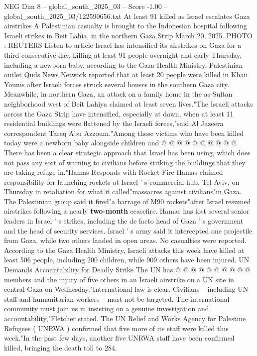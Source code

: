 \begin{textsample}{NEG Dim 8 – global\_south\_2025\_03 – Score -1.00 – global\_south\_2025\_03/122590656.txt}  \label{ex:f8_neg_079}
At least 91 killed as Israel escalates Gaza airstrikes A Palestinian casualty is brought to the Indonesian hospital following Israeli strikes in Beit Lahia, in the northern Gaza Strip March 20, 2025.
PHOTO : REUTERS Listen to article Israel has intensified its airstrikes on Gaza for a third consecutive day, killing at least 91 people overnight and early Thursday, including a newborn baby, according to the Gaza Health Ministry.
Palestinian outlet Quds News Network reported that at least 20 people were killed in Khan Younis after Israeli forces struck several houses in the southern Gaza city.
Meanwhile, in northern Gaza, an attack on a family home in the as-Sultan neighborhood west of Beit Lahiya claimed at least seven lives."The Israeli attacks across the Gaza Strip have intensified, especially at dawn, when at least 11 residential buildings were flattened by the Israeli forces,"said Al Jazeera correspondent Tareq Abu Azzoum."Among those victims who have been killed today were a newborn baby alongside children and @ @ @ @ @ @ @ @ @ @ There has been a clear strategic approach that Israel has been using, which does not pass any sort of warning to civilians before striking the buildings that they are taking refuge in."Hamas Responds with Rocket Fire Hamas claimed responsibility for launching rockets at Israel ' s commercial hub, Tel Aviv, on Thursday in retaliation for what it called"massacres against civilians"in Gaza.
The Palestinian group said it fired"a barrage of M90 rockets"after Israel resumed airstrikes following a nearly \textbf{two-month} ceasefire.
Hamas has lost several senior leaders in Israel ' s strikes, including the de facto head of Gaza ' s government and the head of security services.
Israel ' s army said it intercepted one projectile from Gaza, while two others landed in open areas.
No casualties were reported.
According to the Gaza Health Ministry, Israeli attacks this week have killed at least 506 people, including 200 children, while 909 others have been injured.
UN Demands Accountability for Deadly Strike The UN has @ @ @ @ @ @ @ @ @ @ members and the injury of five others in an Israeli airstrike on a UN site in central Gaza on Wednesday."International law is clear.
Civilians -- including UN staff and humanitarian workers -- must not be targeted.
The international community must join us in insisting on a genuine investigation and accountability,"Fletcher stated.
The UN Relief and Works Agency for Palestine Refugees ( UNRWA ) confirmed that five more of its staff were killed this week."In the past few days, another five UNRWA staff have been confirmed killed, bringing the death toll to 284.

\end{textsample}

